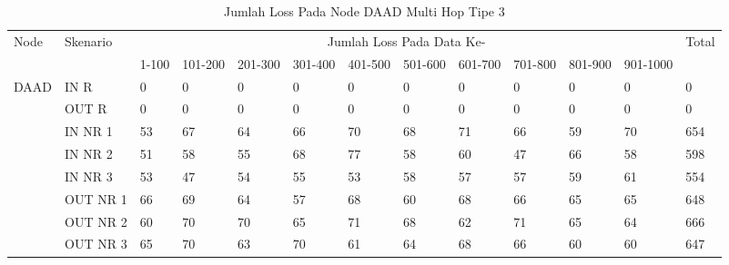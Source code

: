 \begin{table}[H]
  \centering
  \caption{Jumlah Loss Pada Node DAAD Multi Hop Tipe 3}
    \begin{tabular}{|p{1cm}|p{1.9cm}|p{0.6cm}|p{0.6cm}|p{0.6cm}|p{0.6cm}|p{0.6cm}|p{0.6cm}|p{0.6cm}|p{0.6cm}|p{0.6cm}|p{0.6cm}|p{1cm}|}
    \hline
        \multirow{2}{*}{Node}&\multirow{2}{*}{Skenario}&\multicolumn{10}{|c|}{Jumlah Loss Pada Data Ke-}&\multirow{2}{*}{Total} \\\cline{3-12}
          & & 1-100 & 101-200 & 201-300 & 301-400 & 401-500 & 501-600 & 601-700 & 701-800 & 801-900 & 901-1000 & \\
        \hline
    \multirow{8}{*}{DAAD}  
   & IN R  & 0     & 0     & 0     & 0     & 0     & 0     & 0     & 0     & 0     & 0     & 0 \\
          & OUT R & 0     & 0     & 0     & 0     & 0     & 0     & 0     & 0     & 0     & 0     & 0 \\
          & IN NR 1 & 53    & 67    & 64    & 66    & 70    & 68    & 71    & 66    & 59    & 70    & 654 \\
          & IN NR 2 & 51    & 58    & 55    & 68    & 77    & 58    & 60    & 47    & 66    & 58    & 598 \\
          & IN NR 3 & 53    & 47    & 54    & 55    & 53    & 58    & 57    & 57    & 59    & 61    & 554 \\
          & OUT NR 1 & 66    & 69    & 64    & 57    & 68    & 60    & 68    & 66    & 65    & 65    & 648 \\
          & OUT NR 2 & 60    & 70    & 70    & 65    & 71    & 68    & 62    & 71    & 65    & 64    & 666 \\
          & OUT NR 3 & 65    & 70    & 63    & 70    & 61    & 64    & 68    & 66    & 60    & 60    & 647 \\
        \hline
    \end{tabular}%
  \label{tab:addlabel}%
\end{table}%
